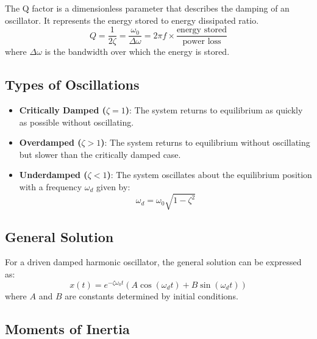 \documentclass[12pt,a4paper]{article}
\begin{document}
	The Q factor is a dimensionless parameter that describes the damping of an oscillator. It represents the energy stored to energy dissipated ratio. 
	\[
	Q = \frac{1}{2\zeta} = \frac{\omega_0}{\Delta \omega} = 2 \pi f \times \frac{\text{energy stored}}{\text{power loss}}
	\]
	where \( \Delta \omega \) is the bandwidth over which the energy is stored.
	
	\subsection*{Types of Oscillations}
	
	\begin{itemize}
		\item \textbf{Critically Damped (\( \zeta = 1 \))}: The system returns to equilibrium as quickly as possible without oscillating.
		\item \textbf{Overdamped (\( \zeta > 1 \))}: The system returns to equilibrium without oscillating but slower than the critically damped case.
		\item \textbf{Underdamped (\( \zeta < 1 \))}: The system oscillates about the equilibrium position with a frequency \( \omega_d \) given by:
		\[
		\omega_d = \omega_0 \sqrt{1 - \zeta^2}
		\]
	\end{itemize}
	
	\subsection*{General Solution}
	
	For a driven damped harmonic oscillator, the general solution can be expressed as:
	\[
	x(t) = e^{-\zeta \omega_0 t} \left( A \cos(\omega_d t) + B \sin(\omega_d t) \right)
	\]
	where \( A \) and \( B \) are constants determined by initial conditions.
	
\subsection*{Moments of Inertia}
\end{document}
